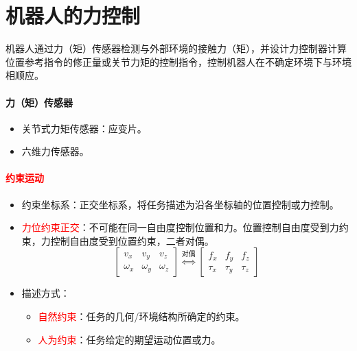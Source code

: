 \documentclass[
12pt, %
a4paper, 
oneside, %
]{scrartcl}
\begin{document}
\section{机器人的力控制}
机器人通过力（矩）传感器检测与外部环境的接触力（矩），并设计力控制器计算位置参考指令的修正量或关节力矩的控制指令，控制机器人在不确定环境下与环境相顺应。
\paragraph{力（矩）传感器}
\begin{itemize}
\item 关节式力矩传感器：应变片。
\item 六维力传感器。
\end{itemize}
\paragraph{\textcolor{red}{约束运动}}
\begin{itemize}
\item 约束坐标系：正交坐标系，将任务描述为沿各坐标轴的位置控制或力控制。
\item \textcolor{red}{力位约束正交}：不可能在同一自由度控制位置和力。位置控制自由度受到力约束，力控制自由度受到位置约束，二者对偶。
$$ \begin{bmatrix} v_x & v_y & v_z \\ \omega_x & \omega_y & \omega_z \end{bmatrix} \overset{\text{对偶}}{\Longleftrightarrow} \begin{bmatrix} f_x & f_y & f_z \\ \tau_x & \tau_y & \tau_z \end{bmatrix} $$
\item 描述方式：
\begin{itemize}
\item \textcolor{red}{自然约束}：任务的几何/环境结构所确定的约束。
\item \textcolor{red}{人为约束}：任务给定的期望运动位置或力。
\end{itemize}
\end{itemize}
\end{document}
